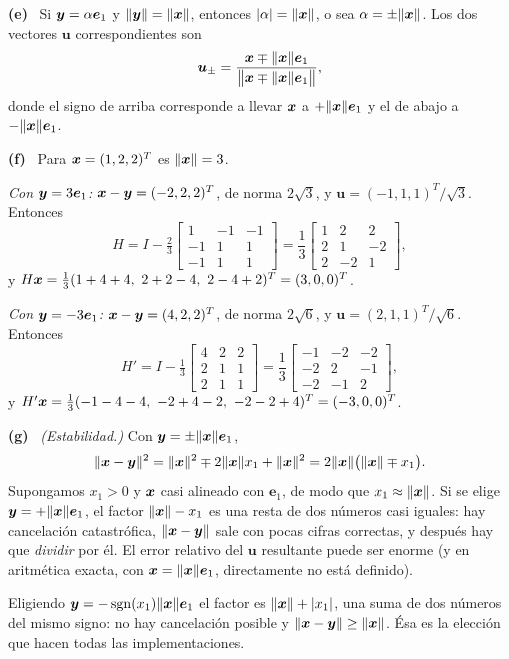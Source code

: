 \documentclass[11pt,a4paper]{article}
\newcommand{\bi}[1]{\boldsymbol{#1}}
\newcommand{\bu}{\bi{u}}  \newcommand{\bv}{\bi{v}}  \newcommand{\bw}{\bi{w}}
\DeclareMathOperator{\sgn}{sgn}
\newcommand{\itemsol}[1]{\par\medskip\noindent\textbf{(#1)}\ \ignorespaces}
\begin{document}
\itemsol{e} Si $\by=\alpha\bi{e}_1$ y $\|\by\|=\|\bx\|$, entonces
$|\alpha|=\|\bx\|$, o sea $\alpha=\pm\|\bx\|$. Los dos vectores $\bu$
correspondientes son
\[
\bu_{\pm}=\frac{\bx\mp\|\bx\|\bi{e}_1}{\big\|\bx\mp\|\bx\|\bi{e}_1\big\|},
\]
donde el signo de arriba corresponde a llevar $\bx$ a $+\|\bx\|\bi{e}_1$ y el de
abajo a $-\|\bx\|\bi{e}_1$.

\itemsol{f} Para $\bx=(1,2,2)^T$ es $\|\bx\|=3$.

\emph{Con $\by=3\bi{e}_1$:} $\bx-\by=(-2,2,2)^T$, de norma $2\sqrt3$, y
$\bu=(-1,1,1)^T/\sqrt3$. Entonces
\[
H=I-\tfrac23\begin{bmatrix}1&-1&-1\\ -1&1&1\\ -1&1&1\end{bmatrix}
 =\frac13\begin{bmatrix}1&2&2\\ 2&1&-2\\ 2&-2&1\end{bmatrix},
\]
y $H\bx=\tfrac13(1+4+4,\ 2+2-4,\ 2-4+2)^T=(3,0,0)^T$.

\emph{Con $\by=-3\bi{e}_1$:} $\bx-\by=(4,2,2)^T$, de norma $2\sqrt6$, y
$\bu=(2,1,1)^T/\sqrt6$. Entonces
\[
H'=I-\tfrac13\begin{bmatrix}4&2&2\\ 2&1&1\\ 2&1&1\end{bmatrix}
  =\frac13\begin{bmatrix}-1&-2&-2\\ -2&2&-1\\ -2&-1&2\end{bmatrix},
\]
y $H'\bx=\tfrac13(-1-4-4,\ -2+4-2,\ -2-2+4)^T=(-3,0,0)^T$.

\itemsol{g} \emph{(Estabilidad.)} Con $\by=\pm\|\bx\|\bi{e}_1$,
\[
\|\bx-\by\|^2=\|\bx\|^2\mp2\|\bx\|x_1+\|\bx\|^2=2\|\bx\|\big(\|\bx\|\mp x_1\big).
\]
Supongamos $x_1>0$ y $\bx$ casi alineado con $\bi{e}_1$, de modo que
$x_1\approx\|\bx\|$. Si se elige $\by=+\|\bx\|\bi{e}_1$, el factor
$\|\bx\|-x_1$ es una resta de dos números casi iguales: hay cancelación
catastrófica, $\|\bx-\by\|$ sale con pocas cifras correctas, y después hay que
\emph{dividir} por él. El error relativo del $\bu$ resultante puede ser enorme
(y en aritmética exacta, con $\bx=\|\bx\|\bi{e}_1$, directamente no está
definido).

Eligiendo $\by=-\sgn(x_1)\|\bx\|\bi{e}_1$ el factor es $\|\bx\|+|x_1|$, una suma
de dos números del mismo signo: no hay cancelación posible y
$\|\bx-\by\|\ge\|\bx\|$. Ésa es la elección que hacen todas las
implementaciones.
\end{document}
